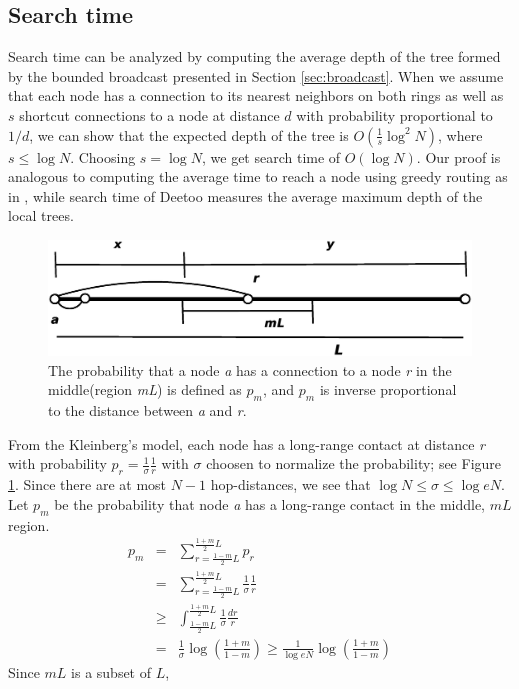 \documentclass[9.5pt,journal,final,finalsubmission,twocolumn]{IEEEtran}
\begin{document}
\subsection{Search time}
\label{sec:search_time}
Search time can be analyzed by computing the average
depth of the tree formed by the bounded broadcast presented in
Section \ref{sec:broadcast}. When we assume that each node 
has a connection to its nearest neighbors on both rings as well as
$s$ shortcut connections to a node at distance $d$ with probability
proportional to $1/d$, we can show that the expected depth of the 
tree is $O(\frac{1}{s}\log^2 N)$, where $s \le \log N$.  Choosing
$s = \log N$, we get search time of $O(\log N)$.
Our proof is analogous to computing the average time 
to reach a node using greedy routing as in \cite{jk:Information,
pr:Symphony}, while search time of 
Deetoo measures the average maximum depth of the local trees.
\begin{figure}
\centering
\includegraphics[width=3 in]{searchtime}
\caption{The probability that a node \textit{a} has a connection to a node \textit{r} 
in the middle(region \textit{mL}) is defined as $p_{m}$, and $p_m$ is inverse 
proportional to the distance between \textit{a} and \textit{r}.} \label{fig:search}
\end{figure}
From the Kleinberg's model, each node has a long-range
contact at distance \textit{r} with probability 
$p_{r}=\frac{1}{\sigma }\frac{1}{r}$ with $\sigma$ choosen to normalize
the probability; see Figure \ref{fig:search}.  Since there
are at most $N-1$ hop-distances, we see that $\log N \le \sigma \le \log eN$.
Let \textit{$p_{m}$} be the probability that node \textit{a} has a long-range
contact in the middle, \textit{$mL$} region.
\begin{eqnarray*}
p_{m} &=& \sum_{r=\frac{1-m}{2}L}^{\frac{1+m}{2}L}p_{r}\\
        &=& \sum_{r=\frac{1-m}{2}L}^{\frac{1+m}{2}L}\frac{1}{\sigma}\frac{1}{r}\\
        &\ge& \int_{\frac{1-m}{2}L}^{\frac{1+m}{2}L}\frac{1}{\sigma}\frac{dr}{r}\\
        &=& \frac{1}{\sigma}\log\left(\frac{1+m}{1-m}\right) \ge \frac{1}{\log eN} \log\left(\frac{1+m}{1-m}\right)
\end{eqnarray*}
Since \textit{$mL$} is a subset of \textit{$L$},
\end{document}
